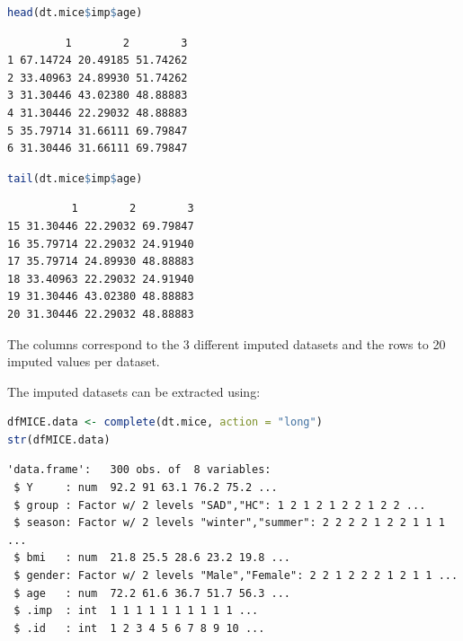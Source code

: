 \documentclass[12pt]{article}
\begin{document}
\begin{minipage}{0.5\linewidth}
\begin{lstlisting}[language=r,numbers=none]
head(dt.mice$imp$age)
\end{lstlisting}

\label{}
\begin{verbatim}
         1        2        3
1 67.14724 20.49185 51.74262
2 33.40963 24.89930 51.74262
3 31.30446 43.02380 48.88883
4 31.30446 22.29032 48.88883
5 35.79714 31.66111 69.79847
6 31.30446 31.66111 69.79847
\end{verbatim}


\end{minipage}
\begin{minipage}{0.45\linewidth}
\begin{lstlisting}[language=r,numbers=none]
tail(dt.mice$imp$age)
\end{lstlisting}

\label{}
\begin{verbatim}
          1        2        3
15 31.30446 22.29032 69.79847
16 35.79714 22.29032 24.91940
17 35.79714 24.89930 48.88883
18 33.40963 22.29032 24.91940
19 31.30446 43.02380 48.88883
20 31.30446 22.29032 48.88883
\end{verbatim}

\end{minipage}


The columns correspond to the 3 different imputed datasets and the
rows to 20 imputed values per dataset.

\clearpage

The imputed datasets can be extracted using:

\begin{lstlisting}[language=r,numbers=none]
dfMICE.data <- complete(dt.mice, action = "long")
str(dfMICE.data)
\end{lstlisting}

\label{}
\begin{verbatim}
'data.frame':	300 obs. of  8 variables:
 $ Y     : num  92.2 91 63.1 76.2 75.2 ...
 $ group : Factor w/ 2 levels "SAD","HC": 1 2 1 2 1 2 2 1 2 2 ...
 $ season: Factor w/ 2 levels "winter","summer": 2 2 2 2 1 2 2 1 1 1 ...
 $ bmi   : num  21.8 25.5 28.6 23.2 19.8 ...
 $ gender: Factor w/ 2 levels "Male","Female": 2 2 1 2 2 2 1 2 1 1 ...
 $ age   : num  72.2 61.6 36.7 51.7 56.3 ...
 $ .imp  : int  1 1 1 1 1 1 1 1 1 1 ...
 $ .id   : int  1 2 3 4 5 6 7 8 9 10 ...
\end{verbatim}
\end{document}
